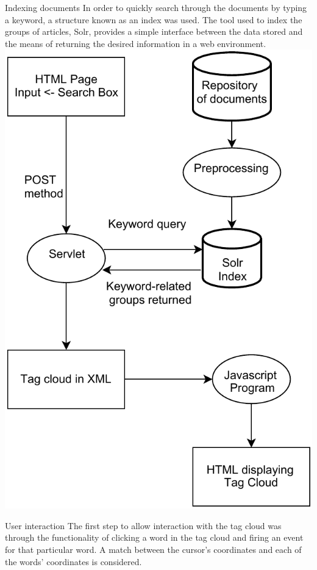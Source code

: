 \documentclass[a0paper, portrait]{baposter}
\begin{document}
\begin{poster}
  \begin{posterbox}[column=1, name=index, below=semantic]{Indexing documents} {
    In order to quickly search through the documents by typing a keyword, a structure known as an index was used. The tool used to index the groups of articles, Solr, provides a simple interface between the data stored and the means of returning the desired information in a web environment. \\[3ex]
    \includegraphics[width=\linewidth]{arch.pdf}
    \label{fig:4}
    }
  \end{posterbox}

  \begin{posterbox}[name=interact, column=2, row=0]{User interaction} {
    The first step to allow interaction with the tag cloud was through the functionality of clicking a word in the tag cloud and firing an event for that particular word. A match between the cursor's coordinates\cite{Lopez} and each of the words' coordinates is considered. %
  }
  \end{posterbox}


\end{poster}
\end{document}
